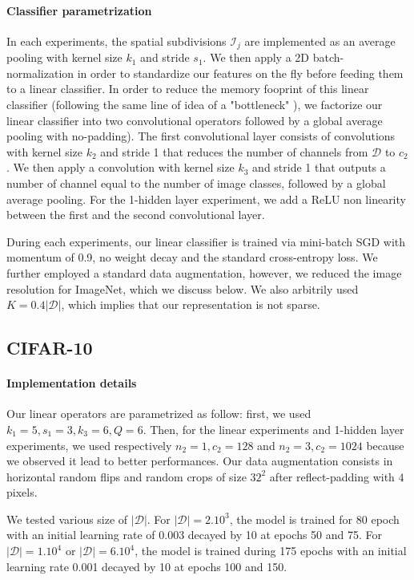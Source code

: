 \documentclass{article}
\begin{document}
\paragraph{Classifier parametrization} In each experiments, the spatial subdivisions $\mathcal{I}_j$ are implemented as an average pooling with kernel size $k_1$ and stride $s_1$.
We then apply a 2D batch-normalization \citep{ioffe2015batch} in order to standardize our features on the fly before feeding them to a linear classifier.
In order to reduce the memory fooprint of this linear classifier (following the same line of idea of a "bottleneck" \citep{he2016deep}), we factorize our linear classifier into two convolutional operators followed by a global average pooling with no-padding).  The first convolutional layer  consists of  convolutions with kernel size $k_2$ and stride 1 that reduces the number of channels from $\mathcal{D}$ to $c_2$. 
We then apply a  convolution with kernel size $k_3$ and stride 1 that outputs a number of channel equal to the number of image classes, followed by a global average pooling.
For the 1-hidden layer experiment, we  add a ReLU non linearity between the first and the second convolutional layer.

During each experiments,  our linear classifier is trained via mini-batch SGD with momentum of 0.9, no weight decay and the standard cross-entropy loss. We further employed a standard data augmentation, however, we reduced the image resolution for ImageNet, which we discuss below. We also arbitrily used $K=0.4 |\mathcal{D}|$, which implies that our representation is not sparse.



\subsection{CIFAR-10}

 \paragraph{Implementation details} Our linear operators are parametrized as follow: first, we used $k_1=5,s_1=3,k_3=6,Q=6$.
 Then, for the linear experiments and 1-hidden layer experiments, we used respectively $n_2=1, c_2=128$ and  $ n_2=3,c_2=1024$ because we observed it lead to better performances.
Our data augmentation consists in horizontal random flips and random crops of size $32^2$ after  reflect-padding with $4$ pixels.

We tested various size of $|\mathcal{D}|$. For $|\mathcal{D}|=2. 10^3$, the model is trained for 80 epoch with an initial learning rate of 0.003 decayed by 10 at epochs 50 and 75.
For  $|\mathcal{D}|=1.10^4$ or $|\mathcal{D}|=6. 10^4$, the model is trained during 175 epochs with an initial learning rate 0.001 decayed by 10 at epochs 100 and  150. 
\end{document}
